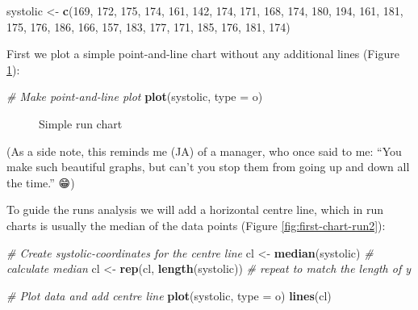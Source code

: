 \documentclass[
]{book}
\makeatletter
\newenvironment{Shaded}{\begin{snugshade}}{\end{snugshade}}
\newcommand{\AttributeTok}[1]{\textcolor[rgb]{0.13,0.29,0.53}{#1}}
\newcommand{\CommentTok}[1]{\textcolor[rgb]{0.56,0.35,0.01}{\textit{#1}}}
\newcommand{\DecValTok}[1]{\textcolor[rgb]{0.00,0.00,0.81}{#1}}
\newcommand{\FunctionTok}[1]{\textcolor[rgb]{0.13,0.29,0.53}{\textbf{#1}}}
\newcommand{\NormalTok}[1]{#1}
\newcommand{\OtherTok}[1]{\textcolor[rgb]{0.56,0.35,0.01}{#1}}
\newcommand{\StringTok}[1]{\textcolor[rgb]{0.31,0.60,0.02}{#1}}
\newcommand*\pandocbounded[1]{%
  \sbox\pandoc@box{#1}%
  \Gscale@div\@tempa{\textheight}{\dimexpr\ht\pandoc@box+\dp\pandoc@box\relax}%
  \Gscale@div\@tempb{\linewidth}{\wd\pandoc@box}%
  \ifdim\@tempb\p@<\@tempa\p@\let\@tempa\@tempb\fi%
  \ifdim\@tempa\p@<\p@\scalebox{\@tempa}{\usebox\pandoc@box}%
  \else\usebox{\pandoc@box}%
  \fi%
}
\makeatother
\begin{document}
\begin{Shaded}
\begin{Highlighting}[]
\NormalTok{systolic }\OtherTok{\textless{}{-}} \FunctionTok{c}\NormalTok{(}\DecValTok{169}\NormalTok{, }\DecValTok{172}\NormalTok{, }\DecValTok{175}\NormalTok{, }\DecValTok{174}\NormalTok{, }\DecValTok{161}\NormalTok{, }\DecValTok{142}\NormalTok{,}
              \DecValTok{174}\NormalTok{, }\DecValTok{171}\NormalTok{, }\DecValTok{168}\NormalTok{, }\DecValTok{174}\NormalTok{, }\DecValTok{180}\NormalTok{, }\DecValTok{194}\NormalTok{,}
              \DecValTok{161}\NormalTok{, }\DecValTok{181}\NormalTok{, }\DecValTok{175}\NormalTok{, }\DecValTok{176}\NormalTok{, }\DecValTok{186}\NormalTok{, }\DecValTok{166}\NormalTok{,}
              \DecValTok{157}\NormalTok{, }\DecValTok{183}\NormalTok{, }\DecValTok{177}\NormalTok{, }\DecValTok{171}\NormalTok{, }\DecValTok{185}\NormalTok{, }\DecValTok{176}\NormalTok{,}
              \DecValTok{181}\NormalTok{, }\DecValTok{174}\NormalTok{)}
\end{Highlighting}
\end{Shaded}

First we plot a simple point-and-line chart without any additional lines (Figure \ref{fig:first-chart-run1}):

\begin{Shaded}
\begin{Highlighting}[]
\CommentTok{\# Make point{-}and{-}line plot}
\FunctionTok{plot}\NormalTok{(systolic, }\AttributeTok{type =} \StringTok{\textquotesingle{}o\textquotesingle{}}\NormalTok{)}
\end{Highlighting}
\end{Shaded}

\begin{figure}
\centering
\pandocbounded{}
\caption{\label{fig:first-chart-run1}Simple run chart}
\end{figure}

(As a side note, this reminds me (JA) of a manager, who once said to me: ``You make such beautiful graphs, but can't you stop them from going up and down all the time.'' 😁)

To guide the runs analysis we will add a horizontal centre line, which in run charts is usually the median of the data points (Figure \ref{fig:first-chart-run2}):

\begin{Shaded}
\begin{Highlighting}[]
\CommentTok{\# Create systolic{-}coordinates for the centre line}
\NormalTok{cl  }\OtherTok{\textless{}{-}} \FunctionTok{median}\NormalTok{(systolic)           }\CommentTok{\# calculate median}
\NormalTok{cl  }\OtherTok{\textless{}{-}} \FunctionTok{rep}\NormalTok{(cl, }\FunctionTok{length}\NormalTok{(systolic))  }\CommentTok{\# repeat to match the length of y}

\CommentTok{\# Plot data and add centre line}
\FunctionTok{plot}\NormalTok{(systolic, }\AttributeTok{type =} \StringTok{\textquotesingle{}o\textquotesingle{}}\NormalTok{)}
\FunctionTok{lines}\NormalTok{(cl)}
\end{Highlighting}
\end{Shaded}
\end{document}
